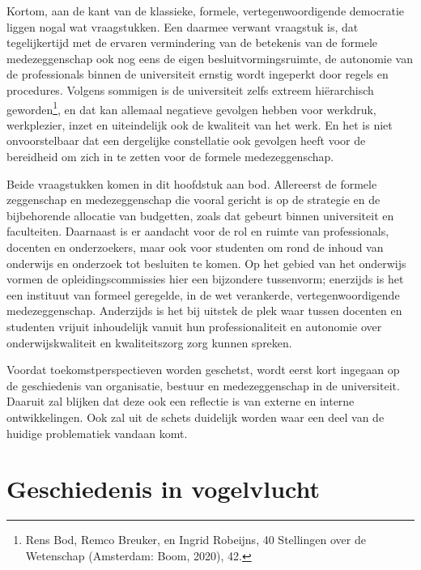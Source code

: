 \documentclass[empirical, authordate, ]{new-jote-article}
\begin{document}
	Kortom, aan de kant van de klassieke, formele, vertegenwoordigende democratie liggen nogal wat vraagstukken. Een daarmee verwant vraagstuk is, dat tegelijkertijd met de ervaren vermindering van de betekenis van de formele medezeggenschap ook nog eens de eigen besluitvormingsruimte, de autonomie van de professionals binnen de universiteit ernstig wordt ingeperkt door regels en procedures. Volgens sommigen is de universiteit zelfs extreem hiërarchisch geworden\footnote{Rens Bod, Remco Breuker, en Ingrid Robeijns, 40 Stellingen over de Wetenschap (Amsterdam: Boom, 2020), 42.}, en dat kan allemaal negatieve gevolgen hebben voor werkdruk, werkplezier, inzet en uiteindelijk ook de kwaliteit van het werk. En het is niet onvoorstelbaar dat een dergelijke constellatie ook gevolgen heeft voor de bereidheid om zich in te zetten voor de formele medezeggenschap.



	Beide vraagstukken komen in dit hoofdstuk aan bod. Allereerst de formele zeggenschap en medezeggenschap die vooral gericht is op de strategie en de bijbehorende allocatie van budgetten, zoals dat gebeurt binnen universiteit en faculteiten. Daarnaast is er aandacht voor de rol en ruimte van professionals, docenten en onderzoekers, maar ook voor studenten om rond de inhoud van onderwijs en onderzoek tot besluiten te komen. Op het gebied van het onderwijs vormen de opleidingscommissies hier een bijzondere tussenvorm; enerzijds is het een instituut van formeel geregelde, in de wet verankerde, vertegenwoordigende medezeggenschap. Anderzijds is het bij uitstek de plek waar tussen docenten en studenten vrijuit inhoudelijk vanuit hun professionaliteit en autonomie over onderwijskwaliteit en kwaliteitszorg zorg kunnen spreken.



	Voordat toekomstperspectieven worden geschetst, wordt eerst kort ingegaan op de geschiedenis van organisatie, bestuur en medezeggenschap in de universiteit. Daaruit zal blijken dat deze ook een reflectie is van externe en interne ontwikkelingen. Ook zal uit de schets duidelijk worden waar een deel van de huidige problematiek vandaan komt.



	\section{Geschiedenis in vogelvlucht}
\end{document}
